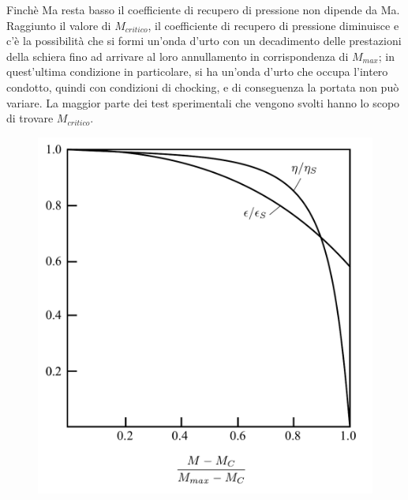 \begin{figure}[h!]
\begin{minipage}{.4\textwidth}
  \label{fig:FuoriProgMach}
\end{minipage}
\end{figure}
Finchè Ma resta basso il coefficiente di recupero di pressione non dipende da Ma. Raggiunto il valore di $M_{critico}$, il coefficiente di recupero di pressione diminuisce e c'è la possibilità che si formi un'onda d'urto con un decadimento delle prestazioni della schiera fino ad arrivare al loro annullamento in corrispondenza di $M_{max}$; in quest'ultima condizione in particolare, si ha un'onda d'urto che occupa l'intero condotto, quindi con condizioni di chocking, e di conseguenza la portata non può variare. La maggior parte dei test sperimentali che vengono svolti hanno lo scopo di trovare $M_{critico}$.
\begin{figure}[h!]
	\centering
	\begin{minipage}{.6\textwidth}
		\centering
		\includegraphics[width=\linewidth]{fig/FuoriProg3.pdf}
		\label{fig:FuoriProg3}
	\end{minipage}%
	\begin{minipage}{.4\textwidth}
		\centering

\end{minipage}
\end{figure}

